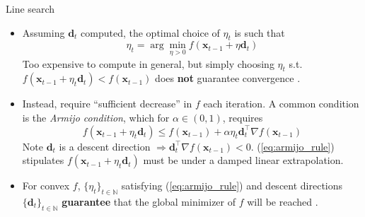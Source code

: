 \documentclass{beamer}
\numberwithin{equation}{section}
\newcommand{\aref}[1]{\alert{\ref{#1}}}
\begin{document}
\begin{frame}{Line search}
    \begin{itemize}
        \item
        Assuming $ \mathbf{d}_t $ computed, the optimal choice of $ \eta_t $
        is such that
        \begin{equation} \label{eq:exact_line_search}
            \eta_t = \arg\min_{\eta > 0}
            f(\mathbf{x}_{t - 1} + \eta\mathbf{d}_t)
        \end{equation}
        Too expensive to compute in general, but simply choosing $ \eta_t $
        s.t. $ f(\mathbf{x}_{t - 1} + \eta_t\mathbf{d}_t) <
        f(\mathbf{x}_{t - 1}) $ does \textbf{not} guarantee convergence
        \cite{nocedal_opt}.

        \item
        Instead, require ``sufficient decrease'' in $ f $ each iteration.
        A common condition is the \textit{Armijo condition}, which for
        $ \alpha \in (0, 1) $, requires
        \begin{equation} \label{eq:armijo_rule}
            f(\mathbf{x}_{t - 1} + \eta_t\mathbf{d}_t) \le
            f(\mathbf{x}_{t - 1}) + \alpha\eta_t\mathbf{d}_t^\top
            \nabla f(\mathbf{x}_{t - 1})
        \end{equation}
        Note $ \mathbf{d}_t $ is a descent direction $ \Rightarrow
        \mathbf{d}_t^\top\nabla f(\mathbf{x}_{t - 1}) < 0 $.
        (\aref{eq:armijo_rule}) stipulates $ f(\mathbf{x}_{t - 1} +
        \eta_t\mathbf{d}_t) $ must be under a damped linear extrapolation.

        \item
        For convex $ f $, $ \{\eta_t\}_{t \in \mathbb{N}} $ satisfying
        (\aref{eq:armijo_rule}) and descent directions
        $ \{\mathbf{d}_t\}_{t \in \mathbb{N}} $ \textbf{guarantee} that the
        global minimizer of $ f $ will be reached \cite{stat_learn_sparsity}.
    \end{itemize}
\end{frame}
\end{document}
